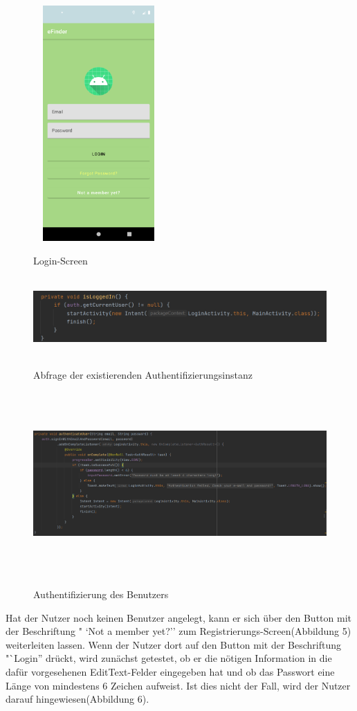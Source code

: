 \documentclass[12pt, a4paper, oneside]{article}
\begin{document}
\begin{figure}
\includegraphics[width=5cm, height=9cm]{Login-Screen.png}
\centering
\label{login}
\caption{Login-Screen}
\end{figure}
\begin{figure}
\includegraphics[width=1\textwidth, height=3cm]{isLoggedIn.png}
\centering
\label{isLoggedIn}
\caption{Abfrage der existierenden Authentifizierungsinstanz}
\end{figure}
\begin{figure}
\includegraphics[width=1\textwidth, height=7cm]{authentication.png}
\centering
\label{authentication}
\caption{Authentifizierung des Benutzers}
\end{figure}
Hat der Nutzer noch keinen Benutzer angelegt, kann er sich über den Button mit der Beschriftung " `Not a member yet?'' zum Registrierungs-Screen(Abbildung 5) weiterleiten lassen. Wenn der Nutzer dort auf den Button mit der Beschriftung "`Login'' drückt, wird zunächst getestet, ob er die nötigen Information in die dafür vorgesehenen EditText-Felder eingegeben hat und ob das Passwort eine Länge von mindestens 6 Zeichen aufweist. Ist dies nicht der Fall, wird der Nutzer darauf hingewiesen(Abbildung 6).\\
\end{document}
